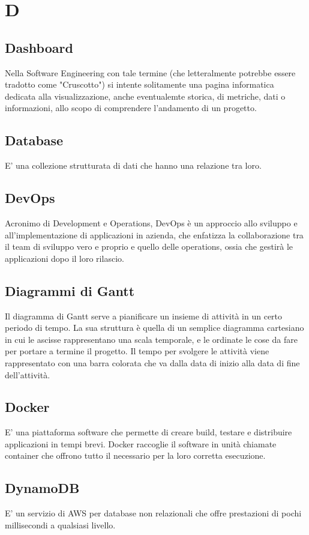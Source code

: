\section*{D}

\subsection{Dashboard}
Nella Software Engineering con tale termine (che letteralmente potrebbe essere tradotto come "Cruscotto") si intente solitamente una pagina  informatica dedicata alla visualizzazione, anche eventualemte storica, di metriche, dati o informazioni, allo scopo di comprendere l'andamento di un progetto.

\subsection{Database}
E' una collezione strutturata di dati che hanno una relazione tra loro.

\subsection{DevOps}
Acronimo di Development e Operations, DevOps è un approccio allo sviluppo e all’implementazione di applicazioni in azienda, che enfatizza la collaborazione tra il team di sviluppo vero e proprio e quello delle operations, ossia che gestirà le applicazioni dopo il loro rilascio.

\subsection{Diagrammi di Gantt}
Il diagramma di Gantt serve a pianificare un insieme di attività in un certo periodo di tempo. La sua struttura è quella di un semplice diagramma cartesiano in cui le ascisse rappresentano una scala temporale, e le ordinate le cose da fare per portare a termine il progetto. Il tempo per svolgere le attività viene rappresentato con una barra colorata che va dalla data di inizio alla data di fine dell'attività.

\subsection{Docker}
E' una piattaforma software che permette di creare build, testare e distribuire applicazioni in tempi brevi. Docker raccoglie il software in unità chiamate container che offrono tutto il necessario per la loro corretta esecuzione.

\subsection{DynamoDB}
E' un servizio di AWS per database non relazionali che offre prestazioni di pochi millisecondi a qualsiasi livello.
